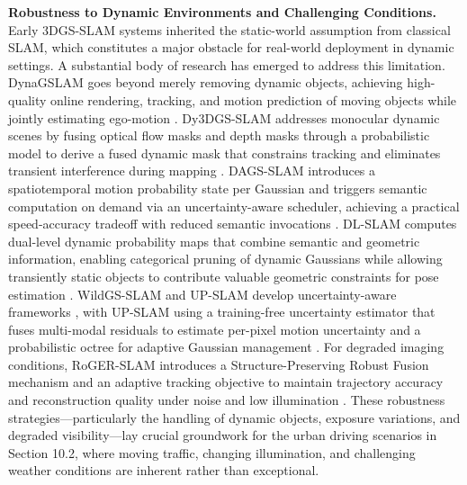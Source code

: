 \documentclass[11pt]{article}
\begin{document}
\textbf{Robustness to Dynamic Environments and Challenging Conditions.} Early 3DGS-SLAM systems inherited the static-world assumption from classical SLAM, which constitutes a major obstacle for real-world deployment in dynamic settings. A substantial body of research has emerged to address this limitation. DynaGSLAM goes beyond merely removing dynamic objects, achieving high-quality online rendering, tracking, and motion prediction of moving objects while jointly estimating ego-motion \cite{ref642}. Dy3DGS-SLAM addresses monocular dynamic scenes by fusing optical flow masks and depth masks through a probabilistic model to derive a fused dynamic mask that constrains tracking and eliminates transient interference during mapping \cite{ref401}. DAGS-SLAM introduces a spatiotemporal motion probability state per Gaussian and triggers semantic computation on demand via an uncertainty-aware scheduler, achieving a practical speed-accuracy tradeoff with reduced semantic invocations \cite{ref404}. DL-SLAM computes dual-level dynamic probability maps that combine semantic and geometric information, enabling categorical pruning of dynamic Gaussians while allowing transiently static objects to contribute valuable geometric constraints for pose estimation \cite{ref643}. WildGS-SLAM and UP-SLAM develop uncertainty-aware frameworks \cite{ref644,ref405}, with UP-SLAM using a training-free uncertainty estimator that fuses multi-modal residuals to estimate per-pixel motion uncertainty and a probabilistic octree for adaptive Gaussian management \cite{ref405}. For degraded imaging conditions, RoGER-SLAM introduces a Structure-Preserving Robust Fusion mechanism and an adaptive tracking objective to maintain trajectory accuracy and reconstruction quality under noise and low illumination \cite{ref645}. These robustness strategies---particularly the handling of dynamic objects, exposure variations, and degraded visibility---lay crucial groundwork for the urban driving scenarios in Section 10.2, where moving traffic, changing illumination, and challenging weather conditions are inherent rather than exceptional.
\end{document}
